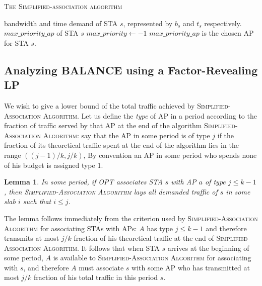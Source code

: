 \documentclass[conference]{IEEEtran}
\newtheorem{lemma}{Lemma}
\begin{document}
    \begin{algorithm}[htb]
    \caption{\textsc{The Simplified-association algorithm}}\label{al:simplified_association_algorithm}
    \begin{algorithmic}[1]
        \REQUIRE bandwidth and time demand of STA $s$, represented by
        $b_s$ and $t_s$
        respectively.
        \ENSURE $max\_priority\_ap$ of STA $s$
        \STATE $max\_priority \leftarrow -1$
        \ENDIF
        \ENDFOR
        \STATE $max\_priority\_ap$ is the chosen AP for STA $s$.
    \end{algorithmic}
  \end{algorithm}

  \subsection{Analyzing BALANCE using a Factor-Revealing LP}
  We wish to give a lower bound of the total traffic achieved  by {\scshape Simplified-Association Algorithm}.  Let us define the {\itshape type} of AP in a period according to the fraction of traffic served by that AP at the end of the algorithm {\scshape Simplified-Association Algorithm}: say that the AP in some period is of type $j$ if the fraction of its theoretical traffic spent at the end of the algorithm lies in the range $((j-1)/k,j/k)$,  By convention an AP in some period who spends none of his budget is assigned type 1.

  \begin{lemma}\label{le:type_slab}
    In some period, if OPT associates STA $s$ with AP $a$ of type $j\leq k-1$, then {\scshape Simplified-Association Algorithm} lays all demanded traffic of $s$ in some slab $i$ such that $i\leq j$.
  \end{lemma}

  The lemma follows immediately from the criterion used by {\scshape Simplified-Association Algorithm} for associating STAs with APs: $A$ has type $j\leq k-1$ and therefore transmits at most $j/k$ fraction of his theoretical traffic at the end of {\scshape Simplified-Association Algorithm}.  It follows that when STA $s$ arrives at the beginning of some period, $A$ is available to {\scshape Simplified-Association Algorithm} for associating with $s$,  and therefore $A$ must associate $s$ with some AP who has transmitted at most $j/k$ fraction of his total traffic in this period $s$.
\end{document}
